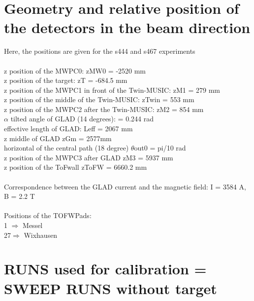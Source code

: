 \documentclass[12pt, letterpaper]{article}
\begin{document}
\section{Geometry and relative position of the detectors in the beam direction}
Here, the positions are given for the s444 and s467 experiments\\
\\
z position of the MWPC0: \hspace{10mm} zMW0 = -2520 mm\\
z position of the target: \hspace{10mm} zT = -684.5 mm\\
z position of the MWPC1 in front of the Twin-MUSIC:  \hspace{10mm}   zM1 = 279 mm \\
z position of the middle of the Twin-MUSIC:  \hspace{10mm}  zTwin = 553 mm\\
z position of the MWPC2 after the Twin-MUSIC:  \hspace{10mm}   zM2 = 854 mm\\
$\alpha$ tilted angle of GLAD (14 degrees):   \hspace{10mm} = 0.244 rad\\
effective length of GLAD:  \hspace{10mm}   L\textunderscore eff = 2067 mm\\
z middle of GLAD  \hspace{10mm}  zGm = 2577mm\\
horizontal of the central path (18 degree) \hspace{10mm}   $\theta$\textunderscore out0 = pi/10 rad\\
z position of the MWPC3 after GLAD   \hspace{10mm}  zM3 = 5937 mm\\
z position of the ToFwall          \hspace{10mm}     zToFW = 6660.2 mm\\
\\
Correspondence between the GLAD current and the magnetic field:  I = 3584 A, B = 2.2 T \\
\\
Positions of the TOFWPads:\\
1 $\Rightarrow$ Messel\\
27$\Rightarrow$ Wixhausen \\

\section{RUNS used for calibration = SWEEP RUNS without target}
\end{document}
